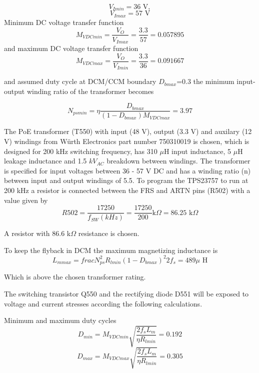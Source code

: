 \begin{equation}
V_{Imin}=36 \text{ V},
\end{equation}
\begin{equation}
V_{Imax}=57 \text{ V}
\end{equation}
Minimum DC voltage transfer function
\begin{equation}
M_{V DCmin}=\frac{V_O}{V_{Imax}}=\frac{3.3}{57}=0.057895
\end{equation}
and maximum DC voltage transfer function
\begin{equation}
M_{V DCmax}=\frac{V_O}{V_{Imin}}=\frac{3.3}{36}=0.091667
\end{equation}

and assumed duty cycle at DCM/CCM boundary $D_{b max}$=0.3 the minimum
input-output winding ratio of the transformer becomes

\begin{equation}
N_{ps min}=\eta \frac{D_{b max}}{(1-D_{b max})M_{V DCmax}}=3.97
\end{equation}

The PoE transformer (T550) with input (48 V), output (3.3 V) and
auxilary (12 V) windings from Würth Electronics part number 750310019
is chosen, which is designed for 200 kHz switching frequency, has 310
$\mu$H input inductance, 5 $\mu$H leakage inductance and 1.5 $kV_{AC}$
breakdown between windings. The transformer is specified for input
voltages between 36 - 57 V DC and has a winding ratio (n) between
input and output windings of 5.5. To program the TPS23757 to run at 200
kHz a resistor is connected between the FRS and ARTN pins (R502) with
a value given by
\begin{equation}
R502 = \frac{17250}{f_{SW} (kHz)} = \frac{17250}{200} \text{
k$\Omega$} = 86.25 \text{ k$\Omega$}
\end{equation}

A resistor with 86.6 k$\Omega$ resistance is chosen.

To keep the flyback in DCM the maximum magnetizing inductance is
\begin{equation}
L_{m max}=frac{N_{ps}^2 R_{l min} (1-D_{b max})^2}{2
f_{s}}=489 \text{$\mu$ H}
\end{equation}

Which is above the chosen transformer rating.

The switching transistor Q550 and the rectifying diode D551 will be
exposed to voltage and current stresses according the following
calculations.

Minimum and maximum duty cycles
\begin{equation}
D_{min}=M_{V DCmin} \sqrt{\frac{2 f_s L_m}{\eta R_{l min}}}=0.192
\end{equation}
\begin{equation}
D_{max}=M_{V DCmax} \sqrt{\frac{2 f_s L_m}{\eta R_{l min}}}=0.305
\end{equation}

